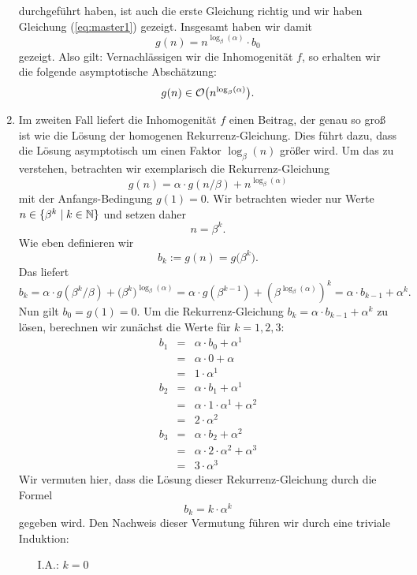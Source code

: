 \begin{enumerate}
durchgef\"uhrt haben, ist auch die erste Gleichung richtig und wir haben Gleichung (\ref{eq:master1}) gezeigt.
Insgesamt haben wir damit 
\[ g(n) = n^{\log_\beta(\alpha)} \cdot b_0 \]
gezeigt.  Also gilt: Vernachl\"assigen wir die Inhomogenit\"at $f$, so erhalten wir
die folgende asymptotische Absch\"atzung:
\[ g(n) \in \mathcal{O}\bigl(n^{\log_\beta(\alpha)}\bigr). \]
\item Im zweiten Fall liefert
die Inhomogenit\"at $f$ einen Beitrag, der genau so gro{\ss} ist wie die L\"osung der homogenen
Rekurrenz-Gleichung.  Dies f\"uhrt dazu, dass die L\"osung asymptotisch um einen Faktor
$\log_\beta(n)$ gr\"o{\ss}er wird.  Um das zu verstehen, betrachten wir exemplarisch die Rekurrenz-Gleichung
\[ g(n) = \alpha \cdot g\left(n/\beta\right) + n^{\log_\beta(\alpha)} \]
mit der Anfangs-Bedingung $g(1) = 0$.  Wir betrachten wieder nur Werte 
$n \in \{ \beta^k \mid k \in {\mathbb N} \}$ und setzen daher
\[ n = \beta^k. \]
Wie eben definieren wir
\[ b_k := g(n) = g\bigl(\beta^k\bigr). \]
Das liefert
\[ b_k = \alpha \cdot g\left(\beta^k/\beta\right) + \bigl(\beta^k\bigr)^{\log_\beta(\alpha)}
       = \alpha \cdot g(\beta^{k-1}) + \left(\beta^{\log_\beta(\alpha)}\right)^k
       = \alpha \cdot b_{k-1} + \alpha^k.
 \]
Nun gilt $b_0 = g(1) = 0$.  Um die Rekurrenz-Gleichung $b_k = \alpha \cdot b_{k-1} + \alpha^k$ zu l\"osen,
berechnen wir zun\"achst die Werte f\"ur $k=1,2,3$:
\begin{eqnarray*}
  b_1 & = & \alpha \cdot b_0 + \alpha^1               \\
      & = & \alpha \cdot 0 + \alpha                   \\
      & = & 1 \cdot \alpha^1                          \\[0.2cm]
  b_2 & = & \alpha \cdot b_1 + \alpha^1               \\
      & = & \alpha \cdot 1 \cdot \alpha^1 + \alpha^2  \\
      & = & 2 \cdot \alpha^2                          \\[0.2cm]
  b_3 & = & \alpha \cdot b_2 + \alpha^2               \\
      & = & \alpha \cdot 2 \cdot \alpha^2 + \alpha^3  \\
      & = & 3 \cdot \alpha^3                          
\end{eqnarray*}
Wir vermuten hier, dass die L\"osung dieser Rekurrenz-Gleichung durch die Formel
\[ b_k = k \cdot \alpha^k \]
gegeben wird.  Den Nachweis dieser Vermutung f\"uhren wir durch eine triviale Induktion:
\begin{enumerate}
\item[I.A.:] $k = 0$
             

\end{enumerate}
\end{enumerate}
